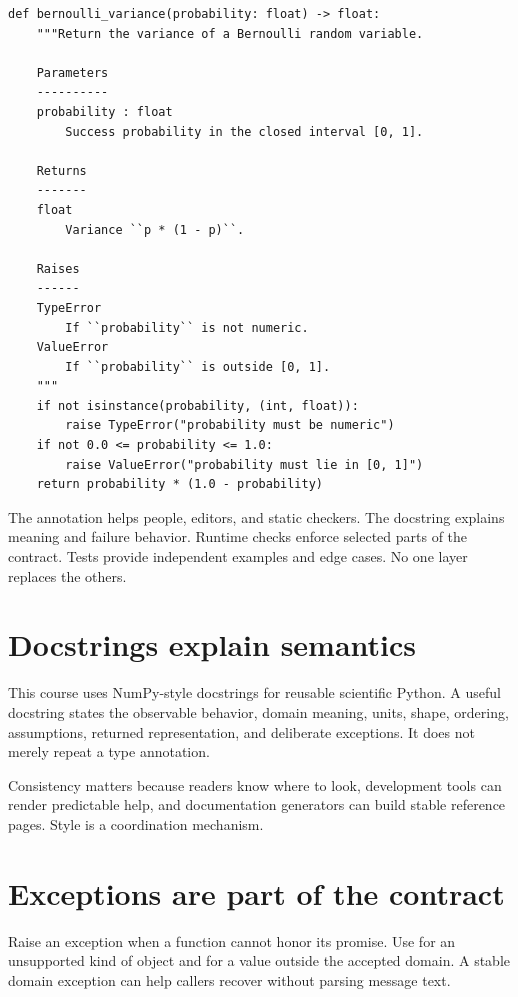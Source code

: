 \begin{lstlisting}
def bernoulli_variance(probability: float) -> float:
    """Return the variance of a Bernoulli random variable.

    Parameters
    ----------
    probability : float
        Success probability in the closed interval [0, 1].

    Returns
    -------
    float
        Variance ``p * (1 - p)``.

    Raises
    ------
    TypeError
        If ``probability`` is not numeric.
    ValueError
        If ``probability`` is outside [0, 1].
    """
    if not isinstance(probability, (int, float)):
        raise TypeError("probability must be numeric")
    if not 0.0 <= probability <= 1.0:
        raise ValueError("probability must lie in [0, 1]")
    return probability * (1.0 - probability)
\end{lstlisting}

The annotation helps people, editors, and static checkers. The docstring
explains meaning and failure behavior. Runtime checks enforce selected parts of
the contract. Tests provide independent examples and edge cases. No one layer
replaces the others.

\section{Docstrings explain semantics}

This course uses NumPy-style docstrings for reusable scientific Python. A useful
docstring states the observable behavior, domain meaning, units, shape, ordering,
assumptions, returned representation, and deliberate exceptions. It does not
merely repeat a type annotation.

Consistency matters because readers know where to look, development tools can
render predictable help, and documentation generators can build stable
reference pages. Style is a coordination mechanism.

\section{Exceptions are part of the contract}

Raise an exception when a function cannot honor its promise. Use
 for an unsupported kind of object and  for a
value outside the accepted domain. A stable domain exception can help callers
recover without parsing message text.

